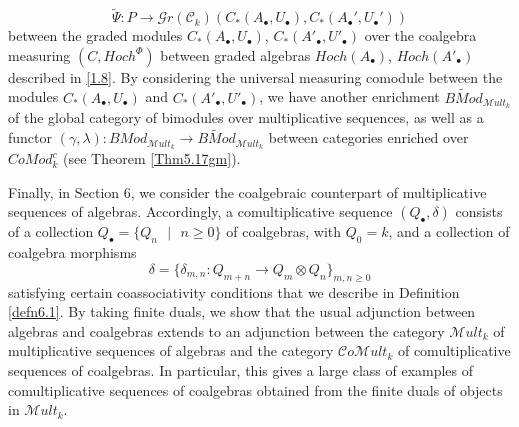 \documentclass[10pt, colorlinks]{article}
\numberwithin{equation}{section} \DeclareMathSizes{2}{10}{12}{13}
\begin{document}
            \begin{equation}
              \widetilde{\Psi}:P\longrightarrow \mathscr Gr(\mathcal C_k)(C_*(A_\bullet,U_\bullet),C_*(A_\bullet',U_\bullet')) 
            \end{equation} between the graded modules $C_*(A_\bullet,U_\bullet)$, $C_*(A'_\bullet,U'_\bullet)$ over the coalgebra measuring $(C,Hoch^\Phi)$ between graded algebras $Hoch(A_\bullet)$, $Hoch(A'_\bullet)$ described in \eqref{1.8}. By considering the universal measuring comodule between the modules $C_*(A_\bullet,U_\bullet)$ and $C_*(A'_\bullet,U'_\bullet)$, we have another enrichment $\widetilde{BMod}_{\mathscr Mult_k}$ of the global category of bimodules over multiplicative sequences, as well as a functor $(\gamma,\lambda): BMod_{\mathscr Mult_k}\longrightarrow \widetilde{BMod}_{\mathscr Mult_k}$ between categories enriched over $CoMod^c_k$ (see Theorem \ref{Thm5.17gm}). 
            
            \smallskip
            Finally, in Section 6, we consider the coalgebraic counterpart of multiplicative sequences of algebras. Accordingly, a comultiplicative sequence $(Q_\bullet,\delta)$ consists of a collection $Q_\bullet=\{\mbox{$Q_n$ $\vert$ $n\geq 0$} \}$ of coalgebras, with $Q_0=k$, and a collection of coalgebra morphisms 
            \begin{equation}
          \delta=\{  \delta_{m,n}:Q_{m+n}\longrightarrow Q_m\otimes Q_n \}_{m,n\geq 0}
            \end{equation} satisfying certain coassociativity conditions that we describe in Definition \ref{defn6.1}. By taking finite duals, we show that the usual adjunction between algebras and coalgebras extends to an adjunction between the category $\mathscr Mult_k$ of multiplicative sequences of algebras and the category $ \mathcal Co\mathscr Mult_k$ of comultiplicative sequences of coalgebras. In particular, this gives a  large class of examples of comultiplicative sequences of coalgebras obtained from the finite duals of objects in $\mathscr Mult_k$. 
            
\end{document}
